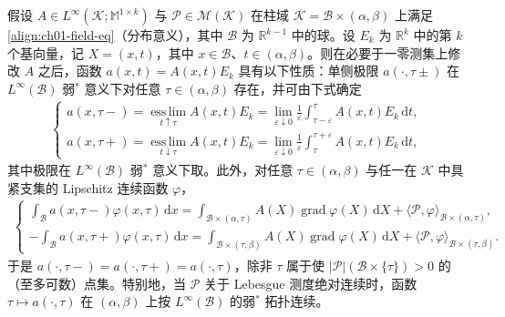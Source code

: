 \documentclass[../../main.tex]{subfiles}
\begin{document}
\begin{lemma}\label{lemma:ch01-平面迹}
假设 $A\in L^{\infty}(\mathscr{K};\mathbb{M}^{1\times k})$ 与 $\mathscr{P}\in\mathscr{M}(\mathscr{K})$ 在柱域 $\mathscr{K}=\mathscr{B}\times(\alpha,\beta)$ 上满足\cref{align:ch01-field-eq}（分布意义），其中 $\mathscr{B}$ 为 $\mathbb{R}^{k-1}$ 中的球。设 $E_{k}$ 为 $\mathbb{R}^{k}$ 中的第 $k$ 个基向量，记 $X=(x,t)$，其中 $x\in\mathscr{B}$、$t\in(\alpha,\beta)$。则在必要于一零测集上修改 $A$ 之后，函数 $a(x,t)=A(x,t)E_{k}$ 具有以下性质：单侧极限 $a(\cdot,\tau\pm)$ 在 $L^{\infty}(\mathscr{B})$ 弱$^{*}$ 意义下对任意 $\tau\in(\alpha,\beta)$ 存在，并可由下式确定
\begin{align}
\begin{cases}
a(x,\tau-)=\displaystyle\operatorname*{ess\,lim}_{t\uparrow\tau}A(x,t)E_{k}=\lim_{\varepsilon\downarrow 0}\frac{1}{\varepsilon}\int_{\tau-\varepsilon}^{\tau}A(x,t)E_{k}\,\mathrm{d}t,\\[2mm]
a(x,\tau+)=\displaystyle\operatorname*{ess\,lim}_{t\downarrow\tau}A(x,t)E_{k}=\lim_{\varepsilon\downarrow 0}\frac{1}{\varepsilon}\int_{\tau}^{\tau+\varepsilon}A(x,t)E_{k}\,\mathrm{d}t,
\end{cases}\label{align:ch01-trace-one-sided}
\end{align}
其中极限在 $L^{\infty}(\mathscr{B})$ 弱$^{*}$ 意义下取。此外，对任意 $\tau\in(\alpha,\beta)$ 与任一在 $\mathscr{K}$ 中具紧支集的 Lipschitz 连续函数 $\varphi$，
\begin{align}
\begin{cases}
\displaystyle\int_{\mathscr{B}}a(x,\tau-)\varphi(x,\tau)\,\mathrm{d}x
=\int_{\mathscr{B}\times(\alpha,\tau)}A(X)\operatorname{grad}\varphi(X)\,\mathrm{d}X+\langle\mathscr{P},\varphi\rangle_{\mathscr{B}\times(\alpha,\tau)},\\[2mm]
\displaystyle-\int_{\mathscr{B}}a(x,\tau+)\varphi(x,\tau)\,\mathrm{d}x
=\int_{\mathscr{B}\times(\tau,\beta)}A(X)\operatorname{grad}\varphi(X)\,\mathrm{d}X+\langle\mathscr{P},\varphi\rangle_{\mathscr{B}\times(\tau,\beta)}.
\end{cases}\label{align:ch01-trace-identity}
\end{align}
于是 $a(\cdot,\tau-)=a(\cdot,\tau+)=a(\cdot,\tau)$，除非 $\tau$ 属于使 $|\mathscr{P}|(\mathscr{B}\times\{\tau\})>0$ 的（至多可数）点集。特别地，当 $\mathscr{P}$ 关于 Lebesgue 测度绝对连续时，函数 $\tau\mapsto a(\cdot,\tau)$ 在 $(\alpha,\beta)$ 上按 $L^{\infty}(\mathscr{B})$ 的弱$^{*}$ 拓扑连续。
\end{lemma}
\end{document}
